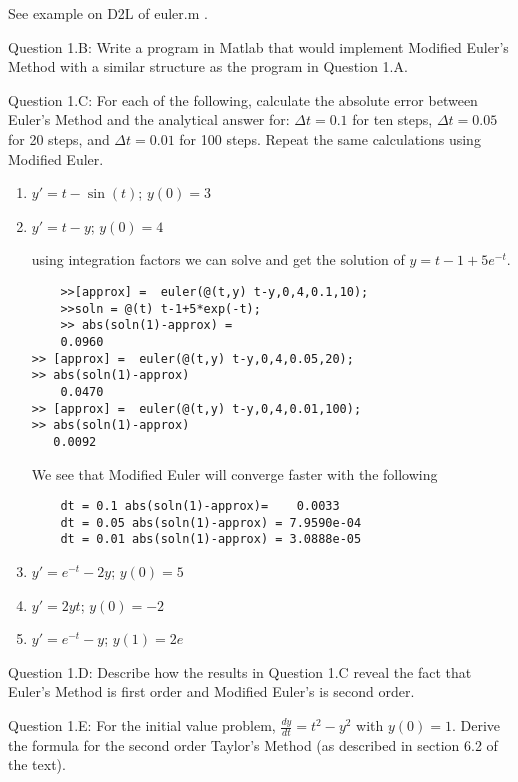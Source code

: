 \documentclass{article}
\def\ds{\displaystyle}
\begin{document}
{\color{teal} See example on D2L of euler.m . }
\medskip \par \noindent
%
Question 1.B: Write a program in Matlab that would implement Modified Euler's Method with a similar structure as the program in Question 1.A. 
\medskip \par \noindent
%
Question 1.C: For each of the following, calculate the absolute error between Euler's Method and the analytical answer for: $\ds \Delta t =0.1$ for ten steps, $\ds \Delta t =0.05$ for 20 steps, and $\ds \Delta t = 0.01$ for 100 steps. Repeat the same calculations using Modified Euler. 
\par
\begin{enumerate}[label=\alph*)]
    \item $\ds y' =t-\sin(t)$; \hspace{0.3in} $y(0)=3$
    \item $\ds y' =t-y$; \hspace{0.4in}  $y(0)=4$
    
    {\color{teal} using integration factors we can solve and get the solution of $y=t-1+5e^{-t}$. 
    \begin{verbatim}
    >>[approx] =  euler(@(t,y) t-y,0,4,0.1,10);
    >>soln = @(t) t-1+5*exp(-t);
    >> abs(soln(1)-approx) = 
    0.0960
>> [approx] =  euler(@(t,y) t-y,0,4,0.05,20);
>> abs(soln(1)-approx)
    0.0470
>> [approx] =  euler(@(t,y) t-y,0,4,0.01,100);
>> abs(soln(1)-approx)
   0.0092
    \end{verbatim}
    
    We see that Modified Euler will converge faster with the following
    \begin{verbatim}
    dt = 0.1 abs(soln(1)-approx)=    0.0033
    dt = 0.05 abs(soln(1)-approx) = 7.9590e-04
    dt = 0.01 abs(soln(1)-approx) = 3.0888e-05 
    \end{verbatim}}
    \item $\ds y' =e^{-t}-2y$; \hspace{0.2in}  $y(0)=5$
    \item $\ds y' =2yt$; \hspace{0.5in}  $y(0)=-2$
    \item $\ds y' =e^{-t}-y$; \hspace{0.3in}  $y(1)=2e$
\end{enumerate}
\medskip \par \noindent
%
Question 1.D: Describe how the results in Question 1.C reveal the fact that Euler's Method is first order and Modified Euler's is second order. 
\medskip \par \noindent
%
Question 1.E: For the initial value problem, $\ds \frac {dy}{dt} = t^2-y^2$ with $\ds y(0)=1$. Derive the formula for the second order Taylor's Method (as described in section 6.2 of the text).  
\end{document}
